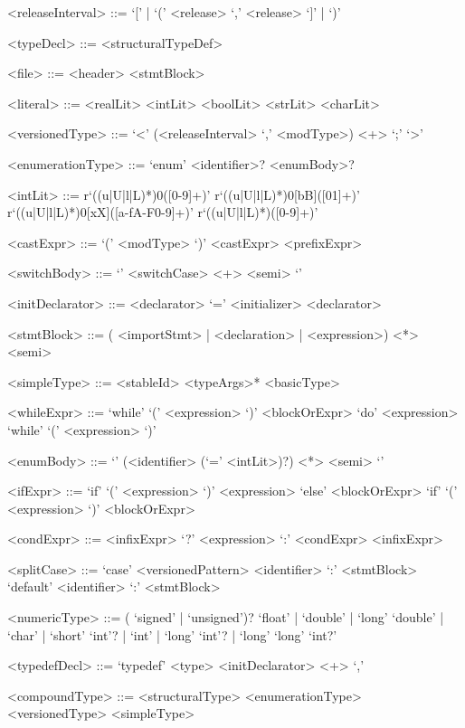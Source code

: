\documentclass[10pt,letterpaper]{article}
\begin{document}
\begin{grammar}
  <releaseInterval> ::= 
    `[' |
    `(' <release> `,' <release> 
    `]' |
    `)'
  
  <typeDecl> ::= <structuralTypeDef>
  
  <file> ::= <header> <stmtBlock>
  
  <literal> ::= <realLit>
    \alt <intLit>
    \alt <boolLit>
    \alt <strLit>
    \alt <charLit>
  
  <versionedType> ::= `<' (<releaseInterval> `,' <modType>) <+> `;' `>'
  
  <enumerationType> ::= `enum' <identifier>? <enumBody>?
  
  <intLit> ::= r`((u|U|l|L)*)0([0-9]+)'
    \alt r`((u|U|l|L)*)0[bB]([01]+)'
    \alt r`((u|U|l|L)*)0[xX]([a-fA-F0-9]+)'
    \alt r`((u|U|l|L)*)([0-9]+)'
  
  <castExpr> ::= `(' <modType> `)' <castExpr>
    \alt <prefixExpr>
  
  <switchBody> ::= `{' <switchCase> <+> <semi> `}'
  
  <initDeclarator> ::= <declarator> `=' <initializer>
    \alt <declarator>
  
  <stmtBlock> ::= (
    <importStmt> |
    <declaration> |
    <expression>) <*> <semi>
  
  <simpleType> ::= <stableId> <typeArgs>*
    \alt <basicType>
  
  <whileExpr> ::= `while' `(' <expression> `)' <blockOrExpr>
    \alt `do' <expression> `while' `(' <expression> `)'
  
  <enumBody> ::= `{' (<identifier> (`=' <intLit>)?) <*> <semi> `}'
  
  <ifExpr> ::= `if' `(' <expression> `)' <expression> `else' <blockOrExpr>
    \alt `if' `(' <expression> `)' <blockOrExpr>
  
  <condExpr> ::= <infixExpr> `?' <expression> `:' <condExpr>
    \alt <infixExpr>
  
  <splitCase> ::= `case' <versionedPattern> <identifier> `:' <stmtBlock>
    \alt `default' <identifier> `:' <stmtBlock>
  
  <numericType> ::= (
    `signed' |
    `unsigned')? 
    `float' |
    `double' |
    `long' `double' |
    `char' |
    `short' `int'? |
    `int' |
    `long' `int'? |
    `long' `long' `int?'
  
  <typedefDecl> ::= `typedef' <type> <initDeclarator> <+> `,'
  
  <compoundType> ::= <structuralType>
    \alt <enumerationType>
    \alt <versionedType>
    \alt <simpleType>
  

\end{grammar}
\end{document}
